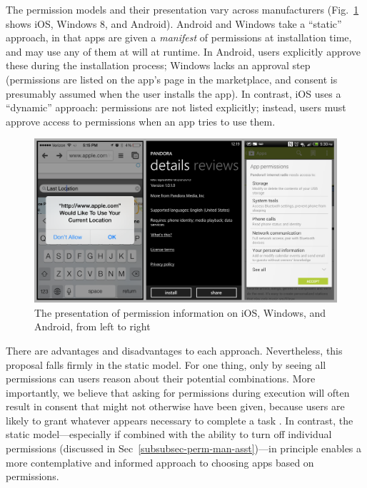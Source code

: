 \documentclass[11pt]{article}
\begin{document}
The permission models and their presentation vary across manufacturers
(Fig.~\ref{permsOSs} shows iOS, Windows 8, and Android). Android and
Windows take a ``static'' approach, in that apps are given a
\emph{manifest} of
permissions at installation time, and may use any of them at will at runtime. In
Android, users explicitly approve these during the installation
process; Windows lacks an approval step (permissions are listed on the
app's page in the marketplace, and consent is presumably assumed when
the user installs the app). In contrast, iOS uses a ``dynamic''
approach: permissions are not listed explicitly; instead, users must
approve access to permissions when an app tries to use them.

\begin{figure}[ht]
\centering
    \includegraphics[width=\linewidth]{img/OSscreenshots.png}
    \vspace{1pt}
    \caption{The presentation of permission information on iOS, Windows, 
    and Android, from left to right}
    \label{permsOSs}
\end{figure}

There are advantages and disadvantages to each approach. Nevertheless,
this proposal falls firmly in the static model. For one thing, only by
seeing all permissions can users reason about their potential
combinations. More importantly, we believe that asking for permissions
during execution will often result in consent that might not otherwise
have been given, because users are likely to grant whatever appears
necessary to complete a task \cite{phisher-wanings-SIGCHI08}. In contrast, the static
model---especially if combined with the ability to turn off individual
permissions (discussed in Sec~\ref{subsubsec-perm-man-asst})---in 
principle enables a more contemplative and
informed approach to choosing apps based on permissions.
\end{document}
